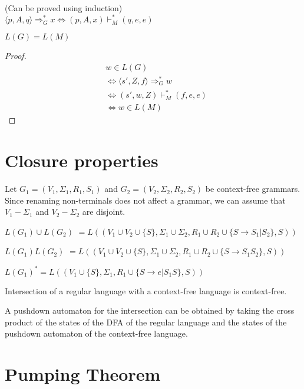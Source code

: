 \begin{lemma}(Can be proved using induction)\\
$\langle p, A, q \rangle \Rightarrow_G^* x \iff (p, A, x) \vdash_M^* (q, e, e)$
\end{lemma}
\begin{theorem}$L(G) = L(M)$\end{theorem}
\begin{proof}
\begin{align*}
& w \in L(G)
\\ &\iff \langle s', Z, f \rangle \Rightarrow_G^* w
\\ &\iff (s', w, Z) \vdash_M^* (f, e, e)
\\ &\iff w \in L(M)
\end{align*}
\end{proof}

\section{Closure properties}

Let $G_1 = (V_1, \Sigma_1, R_1, S_1)$ and $G_2 = (V_2, \Sigma_2, R_2, S_2)$
be context-free grammars. Since renaming non-terminals does not affect a grammar,
we can assume that $V_1 - \Sigma_1$ and $V_2 - \Sigma_2$ are disjoint.

$L(G_1) \cup L(G_2)$
$= L((V_1 \cup V_2 \cup \{S\}, \Sigma_1 \cup \Sigma_2,
R_1 \cup R_2 \cup \{S \rightarrow S_1 | S_2 \}, S))$

$L(G_1)L(G_2)$
$= L((V_1 \cup V_2 \cup \{S\}, \Sigma_1 \cup \Sigma_2,
R_1 \cup R_2 \cup \{S \rightarrow S_1S_2 \}, S))$

$L(G_1)^* = L((V_1 \cup \{S\}, \Sigma_1,
R_1 \cup \{S \rightarrow e | S_1S \}, S))$

\begin{theorem}
Intersection of a regular language with a context-free language is context-free.
\end{theorem}
A pushdown automaton for the intersection can be obtained by taking the
cross product of the states of the DFA of the regular language
and the states of the pushdown automaton of the context-free language.

\section{Pumping Theorem}

